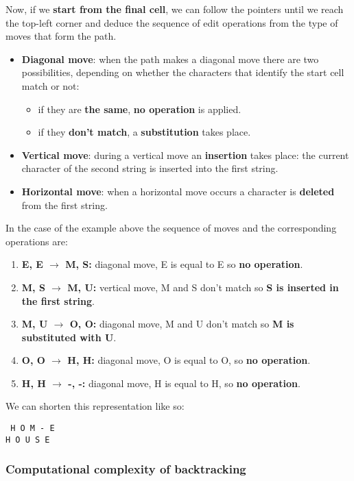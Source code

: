 \documentclass[../main.tex]{subfiles}
\begin{document}
Now, if we \textbf{start from the final cell}, we can follow the pointers until we reach the top-left corner and deduce the sequence of edit operations from the type of moves that form the path.
\begin{itemize}
\item \textbf{Diagonal move}: when the path makes a diagonal move there are two possibilities, depending on whether the characters that identify the start cell match or not:
	\begin{itemize}
	\item if they are \textbf{the same}, \textbf{no operation} is applied.
	\item if they \textbf{don't match}, a \textbf{substitution} takes place.
	\end{itemize}
\item \textbf{Vertical move}: during a vertical move an \textbf{insertion} takes place: the current character of the second string is inserted into the first string.
\item \textbf{Horizontal move}: when a horizontal move occurs a character is \textbf{deleted} from the first string.
\end{itemize}

In the case of the example above the sequence of moves and the corresponding operations are:
\begin{enumerate}
\item \textbf{E, E $\rightarrow$ M, S:} diagonal move, E is equal to E so \textbf{no operation}.
\item \textbf{M, S $\rightarrow$ M, U:} vertical move, M and S don't match so \textbf{S is inserted in the first string}.
\item \textbf{M, U $\rightarrow$ O, O:} diagonal move, M and U don't match so \textbf{M is substituted with U}.
\item \textbf{O, O $\rightarrow$ H, H:} diagonal move, O is equal to O, so \textbf{no operation}.
\item \textbf{H, H $\rightarrow$ -, -:} diagonal move, H is equal to H, so \textbf{no operation}.
\end{enumerate}

We can shorten this representation like so:
\begin{center}
\tt 
H O M - E \\
H O U S E
\end{center}

\subsubsection{Computational complexity of backtracking}
\end{document}
